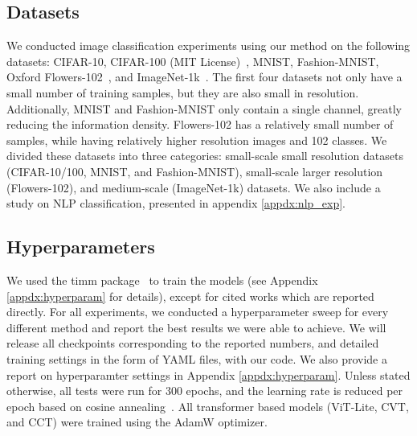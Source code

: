 \documentclass[10pt,twocolumn,letterpaper]{article}
\begin{document}
\subsection{Datasets}
We conducted image classification experiments using our method on the following datasets: CIFAR-10, CIFAR-100 (MIT License)~\cite{krizhevsky2009learning}, MNIST, Fashion-MNIST, Oxford Flowers-102~\cite{nilsback2008automated}, and ImageNet-1k~\cite{deng2009imagenet}. The first four datasets not only have a small number of training samples, but they are also small in resolution.
Additionally, MNIST and Fashion-MNIST only contain a single channel, greatly reducing the information density.
Flowers-102 has a relatively small number of samples, while having relatively higher resolution images and 102 classes.
We divided these datasets into three categories: small-scale small resolution datasets (CIFAR-10/100, MNIST, and Fashion-MNIST), small-scale larger resolution (Flowers-102), and medium-scale (ImageNet-1k) datasets.
We also include a study on NLP classification, presented in appendix \ref{appdx:nlp_exp}.

\subsection{Hyperparameters}
We used the timm package~\cite{rw2019timm} to train the models (see Appendix \ref{appdx:hyperparam} for details), except for cited works which are reported directly.
For all experiments, we conducted a hyperparameter sweep for every different method and report the best results we were able to achieve. We will release all checkpoints corresponding to the reported numbers, and detailed training settings in the form of YAML files, with our code. We also provide a report on hyperparamter settings in Appendix \ref{appdx:hyperparam}.
Unless stated otherwise, all tests were run for 300 epochs, and the learning rate is reduced per epoch based on cosine annealing~\cite{loshchilov2017sgdr}. All transformer based models (ViT-Lite, CVT, and CCT) were trained using the AdamW optimizer.
\end{document}
